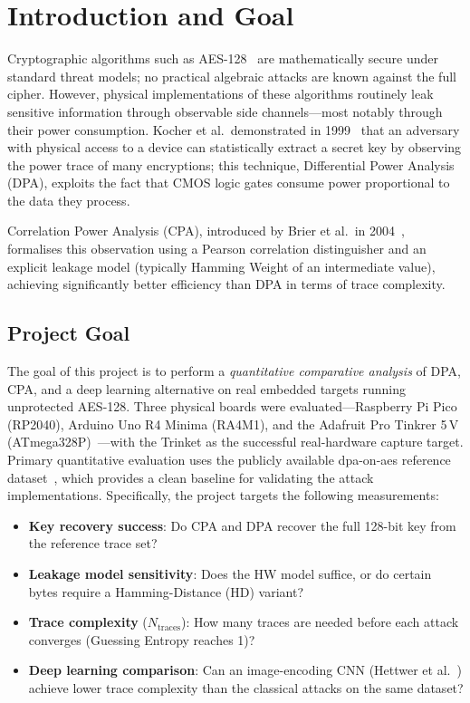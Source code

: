 \section{Introduction and Goal}
\label{sec:intro}

Cryptographic algorithms such as AES-128~\cite{nist2001aes} are mathematically
secure under standard threat models; no practical algebraic attacks are known
against the full cipher.
However, physical implementations of these algorithms routinely leak sensitive
information through observable side channels---most notably through their power
consumption.
Kocher et al.\ demonstrated in 1999~\cite{kocher1999dpa} that an adversary with
physical access to a device can statistically extract a secret key by observing
the power trace of many encryptions; this technique, Differential Power
Analysis (DPA), exploits the fact that CMOS logic gates consume power
proportional to the data they process.

Correlation Power Analysis (CPA), introduced by Brier et al.\ in
2004~\cite{brier2004cpa}, formalises this observation using a Pearson
correlation distinguisher and an explicit leakage model (typically Hamming
Weight of an intermediate value), achieving significantly better efficiency
than DPA in terms of trace complexity.

\subsection*{Project Goal}

The goal of this project is to perform a \emph{quantitative comparative
analysis} of DPA, CPA, and a deep learning alternative on real embedded
targets running unprotected AES-128.
Three physical boards were evaluated---Raspberry Pi Pico (RP2040), Arduino
Uno R4 Minima (RA4M1), and the Adafruit Pro Tinkrer 5\,V
(ATmega328P)~\cite{atmega328p,adafruit_trinket_pro}---with the Trinket
as the successful real-hardware capture target.
Primary quantitative evaluation uses the publicly available dpa-on-aes
reference dataset~\cite{oflynn2015chipwhisperer}, which provides a clean
baseline for validating the attack implementations.
Specifically, the project targets the following measurements:

\begin{itemize}
  \item \textbf{Key recovery success}: Do CPA and DPA recover the full
        128-bit key from the reference trace set?
  \item \textbf{Leakage model sensitivity}: Does the HW model suffice, or
        do certain bytes require a Hamming-Distance (HD) variant?
  \item \textbf{Trace complexity} ($N_\text{traces}$): How many traces are
        needed before each attack converges (Guessing Entropy reaches 1)?
  \item \textbf{Deep learning comparison}: Can an image-encoding CNN
        (Hettwer et al.~\cite{hettwer2020encoding}) achieve lower trace
        complexity than the classical attacks on the same dataset?
\end{itemize}

